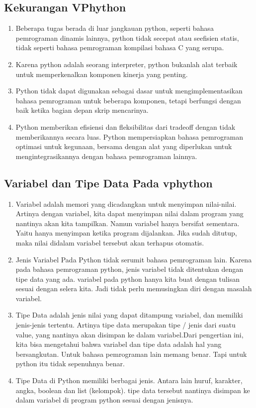 \subsection{Kekurangan VPhython}
		\begin {enumerate}
			\item Beberapa tugas berada di luar jangkauan python, seperti bahasa pemrograman dinamis lainnya, python tidak secepat atau seefisien statis, tidak seperti bahasa pemrograman kompilasi bahasa C yang serupa.
			\item Karena python adalah seorang interpreter, python bukanlah alat terbaik untuk memperkenalkan komponen kinerja yang penting.
			\item Python tidak dapat digunakan sebagai dasar untuk mengimplementasikan bahasa pemrograman untuk beberapa komponen, tetapi berfungsi dengan baik ketika bagian depan skrip mencarinya.
			\item Python memberikan efisiensi dan fleksibilitas dari tradeoff dengan tidak memberikannya secara luas. Python mempersiapkan bahasa pemrograman optimasi untuk kegunaan, bersama dengan alat yang diperlukan untuk mengintegrasikannya dengan bahasa pemrograman lainnya.
		\end{enumerate}
\subsection{Variabel dan Tipe Data Pada vphython}	
		\begin{enumerate}
			\item Variabel adalah memori yang dicadangkan untuk menyimpan nilai-nilai. Artinya dengan variabel, kita dapat menyimpan nilai dalam program yang nantinya akan kita tampilkan. Namun variabel hanya bersifat sementara. Yaitu hanya menyimpan ketika program dijalankan. Jika sudah ditutup, maka nilai didalam variabel tersebut akan terhapus otomatis.
			\item Jenis Variabel Pada Python tidak serumit bahasa pemrograman lain. Karena pada bahasa pemrograman python, jenis variabel tidak ditentukan dengan tipe data yang ada. variabel pada python hanya kita buat dengan tulisan sesuai dengan selera kita. Jadi tidak perlu memusingkan diri dengan masalah variabel.
			\item Tipe Data adalah jenis nilai yang dapat ditampung variabel, dan memiliki jenis-jenis tertentu. Artinya tipe data merupakan tipe / jenis dari suatu value, yang nantinya akan disimpan ke dalam variabel.Dari pengertian ini, kita bisa mengetahui bahwa variabel dan tipe data adalah hal yang bersangkutan. Untuk bahasa pemrograman lain memang benar. Tapi untuk python itu tidak sepenuhnya benar.  
			\item Tipe Data di Python memiliki berbagai jenis. Antara lain huruf, karakter, angka, boolean dan list (kelompok). tipe data tersebut nantinya disimpan ke dalam variabel di program python sesuai dengan jenisnya. 
		\end{enumerate}
	

